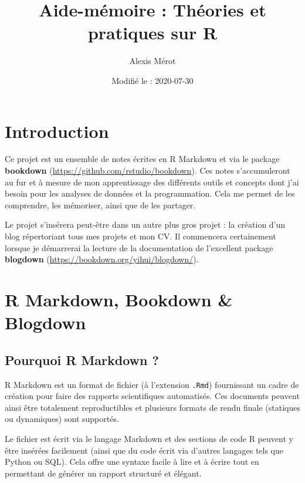 \documentclass[
]{book}
\title{Aide-mémoire : Théories et pratiques sur R}
\author{Alexis Mérot}
\date{Modifié le : 2020-07-30}
\begin{document}
\maketitle

{
\setcounter{tocdepth}{1}
\tableofcontents
}
\hypertarget{introduction}{%
\chapter*{Introduction}\label{introduction}}

Ce projet est un ensemble de notes écrites en R Markdown \autocite{R-rmarkdown} et via
le package \textbf{bookdown} (\url{https://github.com/rstudio/bookdown}). Ces notes
s'accumuleront au fur et à mesure de mon apprentissage des différents outils et
concepts dont j'ai besoin pour les analyses de données et la programmation. Cela
me permet de les comprendre, les mémoriser, ainsi que de les partager.

Le projet s'insérera peut-être dans un autre plus gros projet : la création d'un
blog répertoriant tous mes projets et mon CV. Il commencera certainement lorsque
je démarrerai la lecture de la documentation de l'excellent package \textbf{blogdown}
(\url{https://bookdown.org/yihui/blogdown/}).

\hypertarget{rmarkdown}{%
\chapter{R Markdown, Bookdown \& Blogdown}\label{rmarkdown}}

\hypertarget{pourquoi-rmarkdown}{%
\section{Pourquoi R Markdown ?}\label{pourquoi-rmarkdown}}

R Markdown est un format de fichier (à l'extension \texttt{.Rmd}) fournissant un cadre
de création pour faire des rapports scientifiques automatisés. Ces documents
peuvent ainsi être totalement reproductibles et plusieurs formats de rendu
finale (statiques ou dynamiques) sont supportés.

Le fichier est écrit via le langage Markdown et des sections de code R peuvent y
être insérées facilement (ainsi que du code écrit via d'autres langages tels
que Python ou SQL). Cela offre une syntaxe facile à lire et à écrire tout en
permettant de générer un rapport structuré et élégant.
\end{document}
